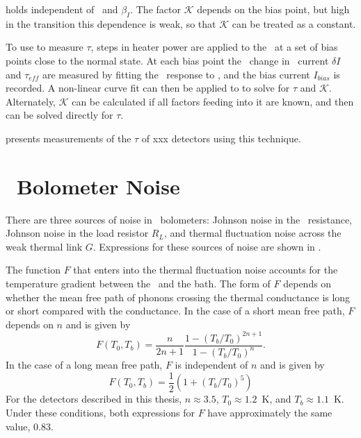  holds independent of \Loop\ and $\beta_I$.
The factor $\mathcal{K}$ depends on the bias point, but high in the transition this dependence is weak, so that $\mathcal{K}$ can be treated as a constant.

To use  to measure $\tau$, steps in heater power are applied to the \TES\ at a set of bias points close to the normal state.
At each bias point the \DC\ change in \TES\ current $\delta I$ and $\tau_{eff}$ are measured by fitting the \TES\ response to , and the bias current $I_{bias}$ is recorded.
A non-linear curve fit can then be applied to  to solve for $\tau$ and $\mathcal{K}$.
Alternately, $\mathcal{K}$ can be calculated if all factors feeding into it are known, and then  can be solved directly for $\tau$.

 presents measurements of the $\tau$ of xxx detectors using this technique.

\section{\TES\ Bolometer Noise}

There are three sources of noise in \TES\ bolometers: Johnson noise in the \TES\ resistance, Johnson noise in the load resistor $R_L$, and thermal fluctuation noise across the weak thermal link $G$.
Expressions for these sources of noise are shown in .

The function $F$ that enters into the thermal fluctuation noise accounts for the temperature gradient between the \TES\ and the bath.
The form of $F$ depends on whether the mean free path of phonons crossing the thermal conductance is long or short compared with the conductance.
In the case of a short mean free path, $F$ depends on $n$ and is given by \cite{mather_bolometer_1982}
\begin{equation}
  F(T_0,T_b) = \frac{n}{2n+1} \frac{1 - (T_b/T_0)^{2n+1}}{1 - (T_b/T_0)^{n}}.
\end{equation}
In the case of a long mean free path, $F$ is independent of $n$ and is given by \cite{boyle_performance_1959}
\begin{equation}
  F(T_0, T_b) = \frac{1}{2} (1 + (T_b/T_0)^5)
\end{equation}
For the detectors described in this thesis, $n \approx 3.5$, $T_0 \approx 1.2$~K, and $T_b \approx 1.1$~K.
Under these conditions, both expressions for $F$ have approximately the same value, 0.83.

